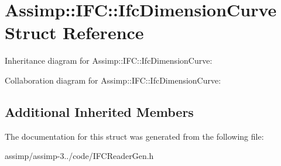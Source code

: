 \hypertarget{struct_assimp_1_1_i_f_c_1_1_ifc_dimension_curve}{\section{Assimp\+:\+:I\+F\+C\+:\+:Ifc\+Dimension\+Curve Struct Reference}
\label{struct_assimp_1_1_i_f_c_1_1_ifc_dimension_curve}
}


Inheritance diagram for Assimp\+:\+:I\+F\+C\+:\+:Ifc\+Dimension\+Curve\+:


Collaboration diagram for Assimp\+:\+:I\+F\+C\+:\+:Ifc\+Dimension\+Curve\+:
\subsection*{Additional Inherited Members}


The documentation for this struct was generated from the following file\+:\begin{DoxyCompactItemize}
\item 
assimp/assimp-\/3../code/I\+F\+C\+Reader\+Gen.\+h\end{DoxyCompactItemize}
